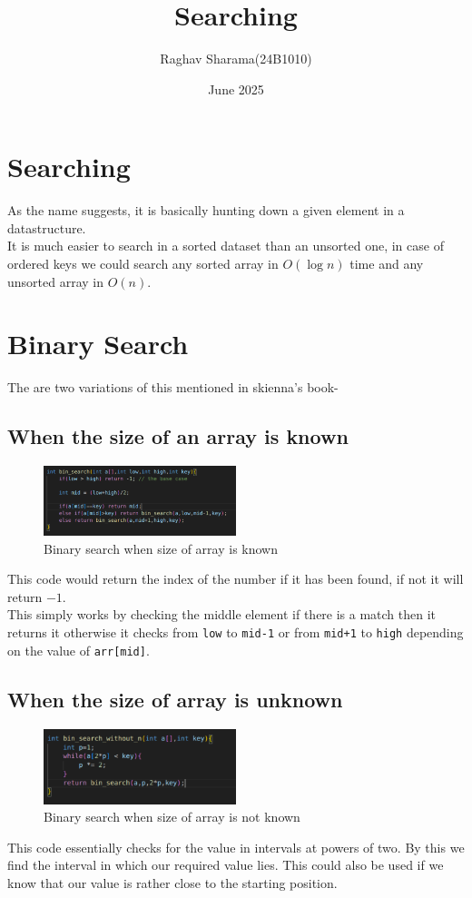 \documentclass[12pt]{article}
\title{Searching}
\author{Raghav Sharama(24B1010)}
\date{June 2025}
\begin{document}
\maketitle

\section{Searching}
As the name suggests, it is basically hunting down a given element in a datastructure.\\
It is much easier to search in a sorted dataset than an unsorted one, in case of ordered keys we could search any sorted array in $O(\log n)$ time and any unsorted array in $O(n)$. 

\section{Binary Search}
The are two variations of this mentioned in skienna's book-
\subsection{When the size of an array is known}

\begin{figure}[h]
    \centering
    \includegraphics[width=0.5\textwidth]{"binsearch1.png"}
    \caption{Binary search when size of array is known}
    \label{fig:binsearch1}
\end{figure}

\noindent This code would return the index of the number if it has been found, if not it will return $-1$.
\\
This simply works by checking the middle element if there is a match then it returns it otherwise it checks from \texttt{low} to \texttt{mid-1} or from \texttt{mid+1} to \texttt{high} depending on the value of \texttt{arr[mid]}.
\subsection{When the size of array is unknown}
\begin{figure}[h]
    \centering
    \includegraphics[width=0.5\textwidth]{"binsearch2.png"}
    \caption{Binary search when size of array is not known}
    \label{fig:binsearch2}
\end{figure}
\noindent This code essentially checks for the value in intervals at powers of two. By this we find the interval in which our required value lies. This could also be used if we know that our value is rather close to the starting position.
\end{document}
